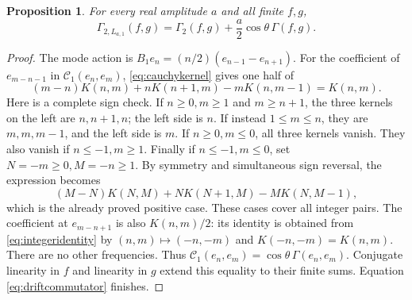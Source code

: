 \documentclass[11pt]{article}
\newtheorem{proposition}[theorem]{Proposition}
\begin{document}
\begin{proposition}\label{prop:sinecorrection}
For every real amplitude $a$ and all finite $f,g$,
\[
 \Gamma_{2,L_{a,1}}(f,g)
 =\Gamma_2(f,g)+\frac a2\cos\theta\,\Gamma(f,g).
\]
\end{proposition}
\begin{proof}
The mode action is
$B_1e_n=(n/2)(e_{n-1}-e_{n+1})$. For the coefficient of
$e_{m-n-1}$ in $\mathcal C_1(e_n,e_m)$, \eqref{eq:cauchykernel}
gives one half of
\begin{equation}\label{eq:integeridentity}
 (m-n)K(n,m)+nK(n+1,m)-mK(n,m-1)=K(n,m).
\end{equation}
Here is a complete sign check. If $n\geq0,m\geq1$ and
$m\geq n+1$, the three kernels on the left are $n,n+1,n$;
the left side is $n$. If instead $1\leq m\leq n$, they are
$m,m,m-1$, and the left side is $m$. If $n\geq0,m\leq0$,
all three kernels vanish. They also vanish if $n\leq-1,m\geq1$.
Finally if $n\leq-1,m\leq0$, set $N=-m\geq0,M=-n\geq1$.
By symmetry and simultaneous sign reversal, the expression becomes
\[
 (M-N)K(N,M)+NK(N+1,M)-MK(N,M-1),
\]
which is the already proved positive case. These cases cover all
integer pairs. The coefficient at $e_{m-n+1}$ is also $K(n,m)/2$:
its identity is obtained from \eqref{eq:integeridentity} by
$(n,m)\mapsto(-n,-m)$ and $K(-n,-m)=K(n,m)$.
There are no other frequencies. Thus
$\mathcal C_1(e_n,e_m)=\cos\theta\,\Gamma(e_n,e_m)$.
Conjugate linearity in $f$ and linearity in $g$ extend this equality
to their finite sums. Equation \eqref{eq:driftcommutator} finishes.
\end{proof}
\end{document}
